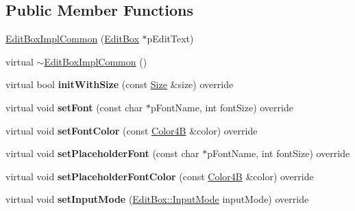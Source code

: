 \subsection*{Public Member Functions}
\begin{DoxyCompactItemize}
\item 
\hyperlink{classui_1_1EditBoxImplCommon_adbe38c744b0a41d37097fa3e70d0d4a3}{Edit\+Box\+Impl\+Common} (\hyperlink{classui_1_1EditBox}{Edit\+Box} $\ast$p\+Edit\+Text)
\item 
virtual \hyperlink{classui_1_1EditBoxImplCommon_afa7e7e295bbfbf51d59ad381ca60e29e}{$\sim$\+Edit\+Box\+Impl\+Common} ()
\item 
\mbox{\label{classui_1_1EditBoxImplCommon_a32744e2e216229fade4fcb85955305bf}} 
virtual bool {\bfseries init\+With\+Size} (const \hyperlink{classSize}{Size} \&size) override
\item 
\mbox{\label{classui_1_1EditBoxImplCommon_a97e6f02961cc6addef087edd08b3a548}} 
virtual void {\bfseries set\+Font} (const char $\ast$p\+Font\+Name, int font\+Size) override
\item 
\mbox{\label{classui_1_1EditBoxImplCommon_aab5cef4d0e764e9a112c44a67037a418}} 
virtual void {\bfseries set\+Font\+Color} (const \hyperlink{structColor4B}{Color4B} \&color) override
\item 
\mbox{\label{classui_1_1EditBoxImplCommon_a26ff2a33bdd1c6199c9542b88e1b1d87}} 
virtual void {\bfseries set\+Placeholder\+Font} (const char $\ast$p\+Font\+Name, int font\+Size) override
\item 
\mbox{\label{classui_1_1EditBoxImplCommon_a5c719b43236f0781eb18409b4995ef05}} 
virtual void {\bfseries set\+Placeholder\+Font\+Color} (const \hyperlink{structColor4B}{Color4B} \&color) override
\item 
\mbox{\label{classui_1_1EditBoxImplCommon_a6b8e53b58e90f8904456aa469988a506}} 
virtual void {\bfseries set\+Input\+Mode} (\hyperlink{classui_1_1EditBox_a7a1bfe8f3ba218bedfcf5451ec3ce01a}{Edit\+Box\+::\+Input\+Mode} input\+Mode) override
\item 
\mbox{\label{classui_1_1EditBoxImplCommon_a80da3a7d30f583c5043b250b582ac08c}} 

\end{DoxyCompactItemize}
